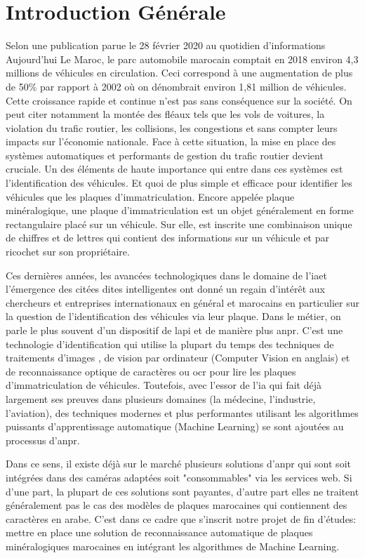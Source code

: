 \chapter*{\textbf{Introduction Générale}}
Selon une publication parue le 28 février 2020 au quotidien d'informations Aujourd'hui Le Maroc, le parc automobile marocain comptait en 2018 environ 4,3 millions de véhicules en circulation. Ceci correspond à une augmentation de plus de 50\% par rapport à 2002 où on dénombrait environ 1,81 million de véhicules. Cette croissance rapide et continue n’est pas sans conséquence sur la société. On peut citer notamment la montée des fléaux tels que les vols de voitures, la violation du trafic routier, les collisions, les congestions et sans compter leurs impacts sur l’économie nationale. Face à cette situation, la mise en place des systèmes automatiques et performants de gestion du trafic routier devient cruciale. Un des éléments de haute importance qui entre dans ces systèmes est l’identification des véhicules. Et quoi de plus simple et efficace pour identifier les véhicules que les plaques d’immatriculation. Encore appelée plaque minéralogique, une plaque d’immatriculation est un objet généralement en forme rectangulaire placé sur un véhicule. Sur elle, est inscrite une combinaison unique de chiffres et de lettres qui contient des informations sur un véhicule et par ricochet sur son propriétaire. 

Ces dernières années, les avancées technologiques dans le domaine de l’\acrfull{ia}et l'émergence des citées dites intelligentes ont donné un regain d'intérêt aux chercheurs et entreprises internationaux en général et marocains en particulier sur la question de l’identification des véhicules via leur plaque. Dans le métier, on  parle le plus souvent d’un dispositif de \acrfull{lapi} et de manière plus \acrfull{anpr}. C’est une technologie d’identification qui utilise la plupart du temps des techniques de traitements d’images , de vision par ordinateur (Computer Vision en anglais) et de reconnaissance optique de caractères ou \acrfull{ocr} pour lire les plaques d’immatriculation de véhicules. Toutefois, avec l’essor de l’\acrshort{ia} qui fait déjà largement ses preuves dans plusieurs domaines (la médecine, l’industrie, l’aviation), des techniques modernes et plus performantes utilisant les algorithmes puissants d’apprentissage automatique (Machine Learning) se sont ajoutées au processus d’\acrshort{anpr}. 

Dans ce sens, il existe déjà sur le marché plusieurs solutions d’\acrshort{anpr} qui sont soit intégrées dans des caméras adaptées soit "consommables" via les services web. Si d’une part, la plupart de ces solutions sont payantes, d'autre part elles ne traitent généralement pas le cas des modèles de plaques marocaines qui contiennent des caractères en arabe. C’est dans ce cadre que s’inscrit notre projet de fin d’études: mettre en place une solution de reconnaissance automatique de plaques minéralogiques marocaines en intégrant les algorithmes de Machine Learning.

